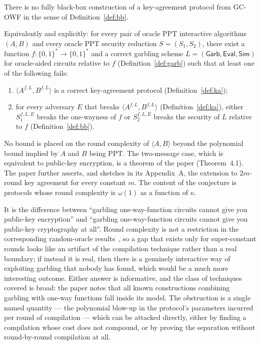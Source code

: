 \documentclass{aicr-conjecture}
\newcommand{\bits}{\{0,1\}}
\newcommand{\Garb}{\mathsf{Garb}}
\newcommand{\Evl}{\mathsf{Eval}}
\newcommand{\Sm}{\mathsf{Sim}}
\newcommand{\GCOWF}{\textup{GC-OWF}}
\begin{document}
\begin{conjecture}[no key agreement from \GCOWF{}]\label{conj:main}
There is no fully black-box construction of a key-agreement protocol from
\GCOWF{} in the sense of Definition~\ref{def:bb}.

Equivalently and explicitly: for every pair of oracle PPT interactive
algorithms $(A,B)$ and every oracle PPT security reduction $S=(S_1,S_2)$,
there exist a function $f\colon\bits^{*}\to\bits^{*}$ and a correct
garbling scheme $L=(\Garb,\Evl,\Sm)$ for oracle-aided circuits relative to
$f$ (Definition~\ref{def:garb}) such that at least one of the following
fails:
\begin{enumerate}
\item $\langle A^{f,L},B^{f,L}\rangle$ is a correct key-agreement protocol
  (Definition~\ref{def:ka});
\item for every adversary $E$ that breaks
  $\langle A^{f,L},B^{f,L}\rangle$ (Definition~\ref{def:ka}), either
  $S_1^{f,L,E}$ breaks the one-wayness of $f$ or $S_2^{f,L,E}$ breaks the
  security of $L$ relative to $f$ (Definition~\ref{def:bb}).
\end{enumerate}
\end{conjecture}

\begin{remark}\label{rem:rounds}
No bound is placed on the round complexity of $\langle A,B\rangle$ beyond
the polynomial bound implied by $A$ and $B$ being PPT. The two-message
case, which is equivalent to public-key encryption, is a theorem of the
paper (Theorem~4.1). The paper further asserts, and sketches in its
Appendix~A, the extension to $2m$-round key agreement for every constant
$m$. The content of the conjecture is protocols whose round complexity is
$\omega(1)$ as a function of $\kappa$.
\end{remark}

\begin{remark}\label{rem:why}
It is the difference between ``garbling one-way-function circuits cannot
give you public-key encryption'' and ``garbling one-way-function circuits
cannot give you public-key cryptography at all''. Round complexity is not
a restriction in the corresponding random-oracle
results~\cite{IR89,BMG09}, so a gap that exists only for super-constant
rounds looks like an artifact of the compilation technique rather than a
real boundary; if instead it is real, then there is a genuinely
interactive way of exploiting garbling that nobody has found, which would
be a much more interesting outcome. Either answer is informative, and the
class of techniques covered is broad: the paper notes that all known
constructions combining garbling with one-way functions fall inside its
model. The obstruction is a single named quantity --- the polynomial
blow-up in the protocol's parameters incurred per round of compilation ---
which can be attacked directly, either by finding a compilation whose cost
does not compound, or by proving the separation without round-by-round
compilation at all.
\end{remark}
\end{document}
